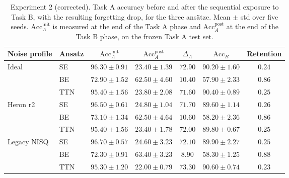 \begin{table}[ht]
\centering
\caption{Experiment 2 (corrected). Task A accuracy before and after the sequential exposure to Task B, with the resulting forgetting drop, for the three ans\"atze. Mean $\pm$ std over five seeds. $\mathrm{Acc}_A^{\text{init}}$ is measured at the end of the Task A phase and $\mathrm{Acc}_A^{\text{post}}$ at the end of the Task B phase, on the frozen Task A test set.}
\label{tab:exp2}
\begin{tabular}{llccccc}
\toprule
Noise profile & Ansatz & $\mathrm{Acc}_A^{\text{init}}$ & $\mathrm{Acc}_A^{\text{post}}$ & $\Delta_A$ & $\mathrm{Acc}_B$ & Retention \\
\midrule
\multirow{3}{*}{Ideal}
  & SE  & $96.30 \pm 0.91$ & $23.40 \pm 1.39$ & $72.90$ & $90.20 \pm 1.60$ & $0.24$ \\
  & BE  & $72.90 \pm 1.52$ & $62.50 \pm 4.60$ & $10.40$ & $57.90 \pm 2.33$ & $0.86$ \\
  & TTN & $95.40 \pm 1.56$ & $23.80 \pm 2.08$ & $71.60$ & $90.40 \pm 0.89$ & $0.25$ \\
\midrule
\multirow{3}{*}{Heron r2}
  & SE  & $96.50 \pm 0.61$ & $24.80 \pm 1.04$ & $71.70$ & $89.60 \pm 1.14$ & $0.26$ \\
  & BE  & $73.10 \pm 1.34$ & $62.50 \pm 4.64$ & $10.60$ & $58.20 \pm 2.36$ & $0.86$ \\
  & TTN & $95.40 \pm 1.56$ & $23.40 \pm 1.78$ & $72.00$ & $89.80 \pm 0.67$ & $0.25$ \\
\midrule
\multirow{3}{*}{Legacy NISQ}
  & SE  & $96.70 \pm 0.57$ & $24.60 \pm 3.23$ & $72.10$ & $89.90 \pm 2.27$ & $0.25$ \\
  & BE  & $72.30 \pm 0.91$ & $63.40 \pm 3.23$ & $8.90$  & $58.30 \pm 1.25$ & $0.88$ \\
  & TTN & $95.30 \pm 1.20$ & $22.00 \pm 0.79$ & $73.30$ & $90.60 \pm 0.74$ & $0.23$ \\
\bottomrule
\end{tabular}
\end{table}
